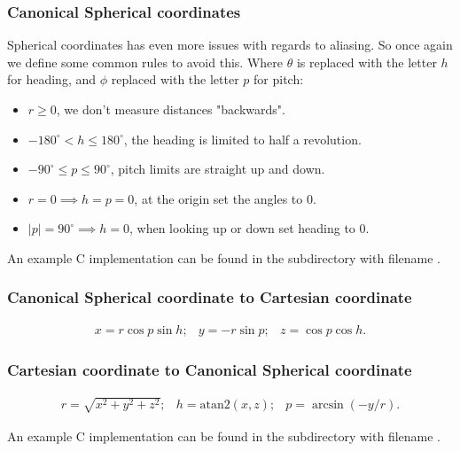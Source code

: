 \subsubsection{Canonical Spherical coordinates}

Spherical coordinates has even more issues with regards to aliasing. So once again we define some common rules to avoid this. Where $\theta$ is replaced with the letter $h$ for heading, and $\phi$ replaced with the letter $p$ for pitch:

\begin{itemize}
	\item $r \geq 0$, we don't measure distances "backwards".
	\item $-180^\circ < h \leq 180^\circ$, the heading is limited to half a revolution.
	\item  $-90^\circ \leq p \leq 90^\circ$, pitch limits are straight up and down.
	\item $r=0 \implies h=p=0$, at the origin set the angles to $0$.
	\item $|p|=90^\circ \implies h=0$, when looking up or down set heading to $0$.
\end{itemize}

An example C implementation can be found in the  subdirectory with filename .

\subsubsection{Canonical Spherical coordinate to Cartesian coordinate}

$$
\begin{array}{lcr}
x=r\cos p \sin h; & y=-r\sin p; & z=\cos p \cos h.
\end{array}
$$

\subsubsection{Cartesian coordinate to Canonical Spherical coordinate}

$$
\begin{array}{lcr}
r=\sqrt{x^2+y^2+z^2}; & h=\text{atan2}(x,z); & p=\arcsin(-y/r).
\end{array}
$$

An example C implementation can be found in the  subdirectory with filename .
